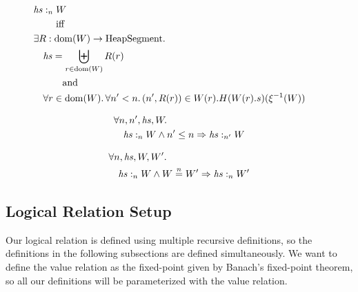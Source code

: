 \documentclass{article}
\newcommand{\nequal}[1][n]{\stackrel{\tiny{#1}}{=}}
\DeclareMathOperator{\dom}{dom}
\newcommand{\var}[1]{\mathit{#1}}
\newcommand{\hs}{\var{hs}}
\newcommand{\heap}{\var{heap}}
\newcommand{\heapSat}[3][\heap]{#1 :_{#2} #3}
\newcommand{\plaindom}[1]{\mathrm{#1}}
\newcommand{\HeapSegments}{\plaindom{HeapSegment}}
\newcommand{\npair}[2][n]{\left(#1,#2 \right)}
\begin{document}
\begin{definition}
\begin{align*}
&\heapSat[\hs]{n}{W} \\
&\qquad\text{ iff }\\
&\exists R : \dom(W) \rightarrow \HeapSegments \ldotp & &\\
&\quad\begin{aligned}
  &\hs = \biguplus_{r \in \dom(W)} R(r) \\
  &\qquad\text{and}\\
  &\forall r \in \dom(W) \ldotp \forall n' < n \ldotp \npair[n']{R(r)} \in W(r).H(W(r).s)(\xi^{-1}(W))
\end{aligned} 
\end{align*}
\end{definition}

\begin{lemma}
\label{lem:heapsat-dc}
  \begin{align*}
    & \forall n,n',\hs, W \ldotp\\
    & \quad \heapSat[\hs]{n}{W} \land n' \leq n \Rightarrow \heapSat[\hs]{n'}{W}
  \end{align*}
\end{lemma}

\begin{lemma}
\label{lem:heapsat-ne}
  \begin{align*}
    & \forall n,\hs, W, W' \ldotp\\
    & \quad \heapSat[\hs]{n}{W} \land W \nequal W' \Rightarrow \heapSat[\hs]{n}{W'}
  \end{align*}
\end{lemma}

\subsection{Logical Relation Setup}
\label{subsec:logical-relation-setup}
Our logical relation is defined using multiple recursive definitions, so the definitions in the following subsections are defined simultaneously. We want to define the value relation as the fixed-point given by Banach's fixed-point theorem, so all our definitions will be parameterized with the value relation.
\end{document}
